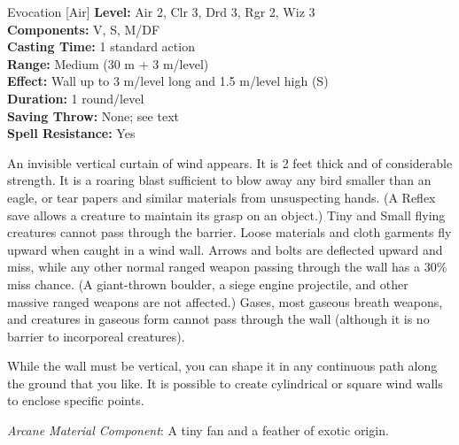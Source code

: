 {Evocation [Air]}
{
	\textbf{Level:}
	Air 2, Clr 3, Drd 3, Rgr 2, Wiz 3\\
	\textbf{Components:}
	V, S, M/DF\\
	\textbf{Casting Time:}
	1 standard action\\
	\textbf{Range:}
	Medium (30 m + 3 m/level)\\
	\textbf{Effect:}
	Wall up to 3 m/level long and 1.5 m/level high (S)\\
	\textbf{Duration:}
	1 round/level\\
	\textbf{Saving Throw:}
	None; see text\\
	\textbf{Spell Resistance:}
	Yes\\
}
{
	An invisible vertical curtain of wind appears. It is 2 feet thick and of considerable strength. It is a roaring blast sufficient to blow away any bird smaller than an eagle, or tear papers and similar materials from unsuspecting hands. (A Reflex save allows a creature to maintain its grasp on an object.) Tiny and Small flying creatures cannot pass through the barrier. Loose materials and cloth garments fly upward when caught in a wind wall. Arrows and bolts are deflected upward and miss, while any other normal ranged weapon passing through the wall has a 30\% miss chance. (A giant-thrown boulder, a siege engine projectile, and other massive ranged weapons are not affected.) Gases, most gaseous breath weapons, and creatures in gaseous form cannot pass through the wall (although it is no barrier to incorporeal creatures).

	While the wall must be vertical, you can shape it in any continuous path along the ground that you like. It is possible to create cylindrical or square wind walls to enclose specific points.

	\textit{Arcane Material Component}:
	A tiny fan and a feather of exotic origin.

}
